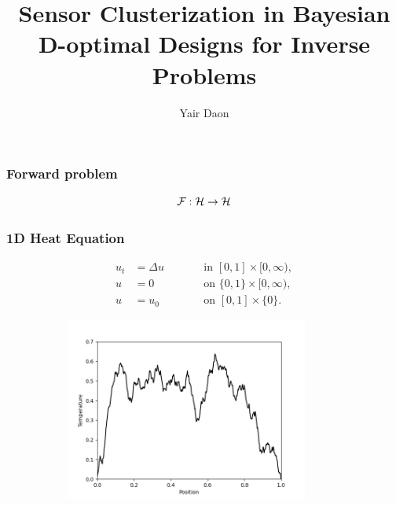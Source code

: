 \documentclass{beamer}
\title{Sensor Clusterization in Bayesian D-optimal Designs for Inverse Problems}
\author{Yair Daon}
\institute{Azrieli Faculty of Medicine, Bar-Ilan University}
\date{}
\begin{document}

\begin{frame}
  \titlepage
\end{frame}

\begin{frame}
\frametitle{Forward problem}

\[
\mathcal{F}: \mathcal{H} \to \mathcal{H}
\]

\begin{figure}
  \centering
\end{figure}
\end{frame}



\begin{frame}
\frametitle{1D Heat Equation}
\begin{subequations}
  \begin{align*}
    u_t &= \Delta u &&\qquad \text{in } [0,1] \times [0,\infty),\\
      u &= 0 &&\qquad \text{on } \{0, 1\} \times [0,\infty),\\
        u &= u_0 &&\qquad \text{on }[0,1] \times \{0\}.
  \end{align*}
\end{subequations}


\begin{figure}
  \centering
  \href{run:forward_heat_equation.mp4}{\includegraphics[width=10cm,height=6cm]{forward_heat_equation.png}}    

\end{figure}
\end{frame}
\end{document}
